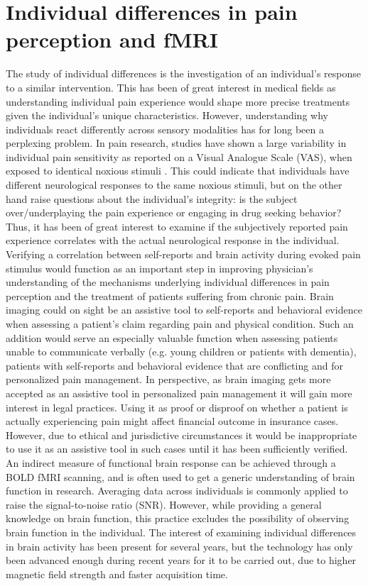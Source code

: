 \section{Individual differences in pain perception and fMRI}
The study of individual differences is the investigation of an individual’s response to a similar intervention. This has been of great interest in medical fields as understanding individual pain experience would shape more precise treatments given the individual’s unique characteristics. However, understanding why individuals react differently across sensory modalities has for long been a perplexing problem. In pain research, studies have shown a large variability in individual pain sensitivity as reported on a Visual Analogue Scale (VAS), when exposed to identical noxious stimuli \cite{Nielsen2008, Coghill2003}. This could indicate that individuals have different neurological responses to the same noxious stimuli, but on the other hand raise questions about the individual's integrity: is the subject over/underplaying the pain experience or engaging in drug seeking behavior? Thus, it has been of great interest to examine if the subjectively reported pain experience correlates with the actual neurological response in the individual. \cite{Coghill2011} Verifying a correlation between self-reports and brain activity during evoked pain stimulus would function as an important step in improving physician’s understanding of the mechanisms underlying individual differences in pain perception and the treatment of patients suffering from chronic pain. Brain imaging could on sight be an assistive tool to self-reports and behavioral evidence when assessing a patient’s claim regarding pain and physical condition. Such an addition would serve an especially valuable function when assessing patients unable to communicate verbally (e.g. young children or patients with dementia), patients with self-reports and behavioral evidence that are conflicting and for personalized pain management. In perspective, as brain imaging gets more accepted as an assistive tool in personalized pain management it will gain more interest in legal practices. Using it as proof or disproof on whether a patient is actually experiencing pain might affect financial outcome in insurance cases. However, due to ethical and jurisdictive circumstances it would be inappropriate to use it as an assistive tool in such cases until it has been sufficiently verified. \cite{Davis2017} \\
An indirect measure of functional brain response can be achieved through a BOLD fMRI scanning, and is often used to get a generic understanding of brain function in research. Averaging data across individuals is commonly applied to raise the signal-to-noise ratio (SNR). However, while providing a general knowledge on brain function, this practice excludes the possibility of observing brain function in the individual. The interest of examining individual differences in brain activity has been present for several years, but the technology has only been advanced enough during recent years for it to be carried out, due to higher magnetic field strength and faster acquisition time. \cite{Dubois2016} \\
